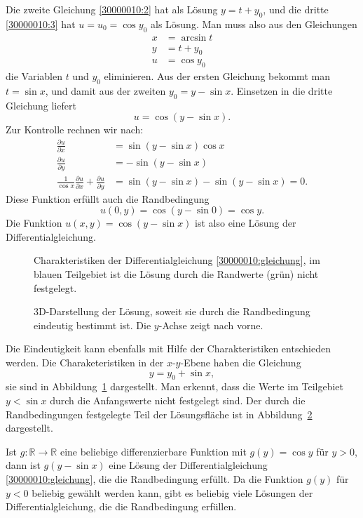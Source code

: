 \begin{loesung}
\begin{teilaufgaben}
Die zweite Gleichung \eqref{30000010:2} hat als Lösung $y=t+y_0$, und
die dritte \eqref{30000010:3} hat $u=u_0=\cos y_0$ als Lösung.
Man muss also aus den Gleichungen
\begin{align*}
x&=\arcsin t\\
y&=t+y_0\\
u&=\cos y_0
\end{align*}
die Variablen $t$ und $y_0$ eliminieren.
Aus der ersten Gleichung bekommt man $t=\sin x$, und damit aus der zweiten
$y_0=y-\sin x$. Einsetzen in die dritte Gleichung liefert
\begin{equation}
u=\cos(y-\sin x).
\end{equation}
Zur Kontrolle rechnen wir nach:
\begin{align*}
\frac{\partial u}{\partial x}&=\sin(y-\sin x)\cos x
\\
\frac{\partial u}{\partial y}&=-\sin(y-\sin x)
\\
\frac1{\cos x}\frac{\partial u}{\partial x}+\frac{\partial u}{\partial y}
&=
\sin(y-\sin x)-\sin(y-\sin x)=0.
\end{align*}
Diese Funktion erfüllt auch die Randbedingung
\begin{equation*}
u(0,y)=\cos(y-\sin 0)=\cos y.
\end{equation*}
Die Funktion $u(x,y)=\cos(y-\sin x)$ ist also eine Lösung der
Differentialgleichung.
\item
\begin{figure}
\centering
{}
\caption{Charakteristiken der Differentialgleichung \eqref{30000010:gleichung},
im blauen Teilgebiet ist die Lösung durch die Randwerte (grün) nicht
festgelegt.
\label{30000010:char}}
\end{figure}
\begin{figure}
\centering
{}
\caption{3D-Darstellung der Lösung, soweit sie durch die Randbedingung
eindeutig bestimmt ist. Die $y$-Achse zeigt nach vorne.
\label{30000010:loesungsflaeche}}
\end{figure}
Die Eindeutigkeit kann ebenfalls mit Hilfe der Charakteristiken entschieden
werden.
Die Charaketeristiken in der $x$-$y$-Ebene haben die Gleichung
\[
y=y_0 + \sin x,
\]
sie sind in Abbildung~\ref{30000010:char} dargestellt.
Man erkennt, dass die Werte im Teilgebiet $y < \sin x$ durch die
Anfangswerte nicht festgelegt sind.
Der durch die Randbedingungen festgelegte Teil der Lösungsfläche ist
in Abbildung~\ref{30000010:loesungsflaeche} dargestellt.

Ist $g\colon\mathbb R\to\mathbb R$ eine beliebige differenzierbare Funktion mit
$g(y)=\cos y$ für $y>0$, dann ist $g(y-\sin x)$ eine Lösung der
Differentialgleichung \eqref{30000010:gleichung}, die die Randbedingung
erfüllt. Da die Funktion $g(y)$ für $y<0$ beliebig gewählt werden
kann, gibt es beliebig viele Lösungen der Differentialgleichung,
die die Randbedingung erfüllen.
\qedhere
\end{teilaufgaben}
\end{loesung}

